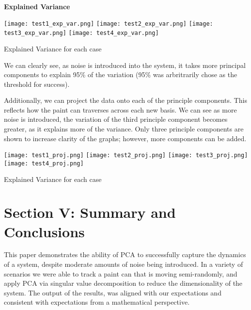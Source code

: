 \documentclass{cup-pan}
\begin{document}
\vskip 0.05in
\textbf{Explained Variance}
\begin{center}
\texttt{[image: test1\_exp\_var.png]}
\texttt{[image: test2\_exp\_var.png]}
\texttt{[image: test3\_exp\_var.png]}
\texttt{[image: test4\_exp\_var.png]}
\end{center}
\caption{Explained Variance for each case}

\noindent
We can clearly see, as noise is introduced into the system, it takes more principal components to explain 95\% of the variation (95\% was arbritrarily chose as the threshold for success). 

\noindent
Additionally, we can project the data onto each of the principle components.  This reflects how the paint can traverses across each new basis. We can see as more noise is introduced, the variation of the third principle component becomes greater, as it explains more of the variance.  Only three principle components are shown to increase clarity of the graphs; however, more components can be added. 

\begin{center}
\texttt{[image: test1\_proj.png]}
\texttt{[image: test2\_proj.png]}
\texttt{[image: test3\_proj.png]}
\texttt{[image: test4\_proj.png]}
\end{center}
\caption{Explained Variance for each case}


\section{Section V: Summary and Conclusions}
This paper demonstrates the ability of PCA to successfully capture the dynamics of a system, despite moderate amounts of noise being introduced. In a variety of scenarios we were able to track a paint can that is moving semi-randomly, and apply PCA via singular value decomposition to reduce the dimensionality of the system.  The output of the results, was aligned with our expectations and consistent with expectations from a mathematical perspective.    

\vskip 0.1in
\noindent


\vskip 0.1in
\noindent
\end{document}

